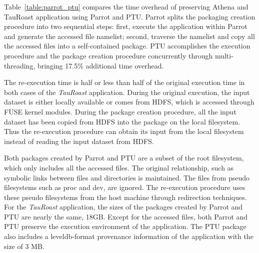Table~\ref{table:parrot_ptu} compares the time overhead of preserving Athena and TauRoast application using Parrot and PTU.
Parrot splits the packaging creation procedure into two sequential steps: first, execute the application within Parrot and generate the accessed file namelist; second, traverse the namelist and copy all the accessed files into a self-contained package.
PTU accomplishes the execution procedure and the package creation procedure concurrently through multi-threading, bringing 17.5\% additional time overhead.

The re-execution time is half or less than half of the original execution time in both cases of the \emph{TauRoast} application. During the original execution, the input dataset is either locally available or comes from HDFS, which is accessed through FUSE kernel modules. During the package creation procedure, all the input dataset has been copied from HDFS into the package on the local filesystem. Thus the re-execution procedure can obtain its input from the local filesystem instead of reading the input dataset from HDFS.

Both packages created by Parrot and PTU are a subset of the root filesystem, which only includes all the accessed files. The original relationship, such as symbolic links between files and directories is maintained. The files from pseudo filesystems such as proc and dev, are ignored. The re-execution procedure uses these pseudo filesystems from the host machine through redirection techniques.
For the \emph{TauRoast} application, the sizes of the packages created by Parrot and PTU are nearly the same, 18GB. 
Except for the accessed files, both Parrot and PTU preserve the execution environment of the application. 
The PTU package also includes a leveldb-format provenance information of the application with the size of 3 MB.

